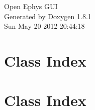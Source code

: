 \documentclass{book}
\begin{document}
\hypersetup{pageanchor=false,citecolor=blue}
\begin{titlepage}
\vspace*{7cm}
\begin{center}
{\Large Open Ephys G\-U\-I }\\
\vspace*{1cm}
{\large Generated by Doxygen 1.8.1}\\
\vspace*{0.5cm}
{\small Sun May 20 2012 20:44:18}\\
\end{center}
\end{titlepage}
\clearemptydoublepage
{}
\tableofcontents
\clearemptydoublepage
{}
\hypersetup{pageanchor=true,citecolor=blue}
\chapter{Class Index}

\chapter{Class Index}

\end{document}
